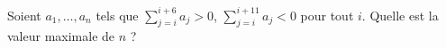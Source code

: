 Soient $a_1, \ldots, a_n$ tels que $\sum_{j=i}^{i+6} a_j > 0$, $\sum_{j=i}^{i+11} a_j < 0$ pour tout $i$. Quelle est la valeur maximale de $n$ ?
